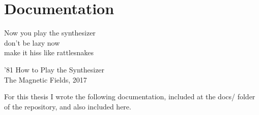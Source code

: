 \chapter{Documentation}

\epigraph{Now you play the synthesizer \\ don't be lazy now \\ make it hiss like rattlesnakes}{'81 How to Play the Synthesizer \\ The Magnetic Fields, 2017}

For this thesis I wrote the following documentation, included at the docs/ folder of the repository, and also included here.








 
